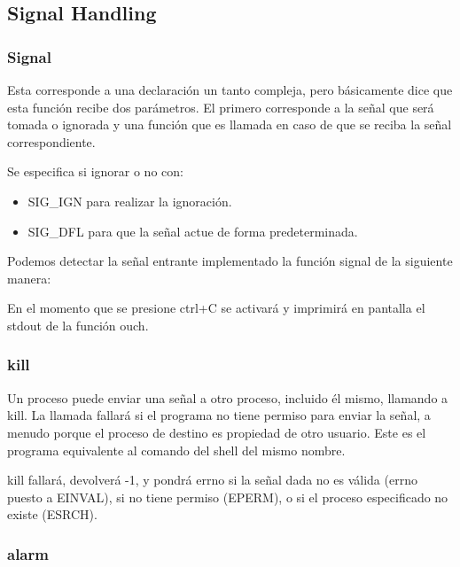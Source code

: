 \documentclass[journal]{IEEEtai}
\begin{document}
\subsection{Signal Handling}

\subsubsection{Signal}



Esta corresponde a una declaración un tanto compleja, pero básicamente dice que esta función recibe dos parámetros. El primero corresponde a la señal que será tomada o ignorada y una función que es llamada en caso de que se reciba la señal correspondiente.

Se especifica si ignorar o no con:

\begin{itemize}
\item	SIG\_IGN para realizar la ignoración.
\item	SIG\_DFL para que la señal actue de forma predeterminada.
\end{itemize}

Podemos detectar la señal entrante implementado la función signal de la siguiente manera:



En el momento que se presione ctrl+C se activará y imprimirá en pantalla el stdout de la función ouch.

\subsubsection{kill}

Un proceso puede enviar una señal a otro proceso, incluido él mismo, llamando a kill. La llamada fallará si el programa no tiene permiso para enviar la señal, a menudo porque el proceso de destino es propiedad de otro usuario. Este es el programa equivalente al comando del shell del mismo nombre.



kill fallará, devolverá -1, y pondrá errno si la señal dada no es válida (errno puesto a EINVAL), si no tiene permiso (EPERM), o si el proceso especificado no existe (ESRCH).

\subsubsection{alarm}
\end{document}
